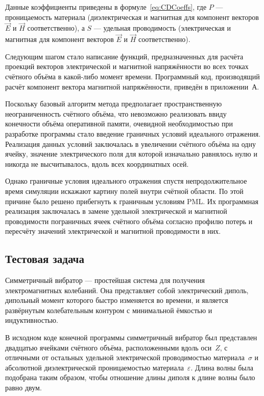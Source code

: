 Данные коэффициенты приведены в формуле~\eqref{eq:CDCoeffs}, где $ P $ --- проницаемость материала (диэлектрическая и магнитная для компонент векторов $\vec{E}$  и $\vec{H}$ соответственно), а $S$ --- удельная проводимость (электрическая и магнитная для компонент векторов $\vec{E}$  и $\vec{H}$ соответственно).

Следующим шагом стало написание функций, предназначенных для расчёта проекций векторов электрической и магнитной напряжённости во всех точках счётного объёма в какой-либо момент времени. Программный код, производящий расчёт компонент вектора магнитной напряжённости, приведён в приложении~А.

Поскольку базовый алгоритм метода предполагает пространственную неограниченность счётного объёма, что невозможно реализовать ввиду конечности объёма оперативной памяти, очевидной необходимостью при разработке программы стало введение граничных условий идеального отражения. Реализация данных условий заключалась в увеличении счётного объёма на одну ячейку, значение электрического поля для которой изначально равнялось нулю и никогда не высчитывалось, вдоль всех координатных осей.

Однако граничные условия идеального отражения спустя непродолжительное время симуляции искажают картину полей внутри счётной области. По этой причине было решено прибегнуть к граничным условиям PML. Их программная реализация заключалась в замене удельной электрической и магнитной проводимости пограничных ячеек счётного объёма согласно профилю потерь и пересчёту значений электрической и магнитной проводимости в них.

\subsection{Тестовая задача}

Симметричный вибратор --- простейшая система для получения электромагнитных колебаний. Она представляет собой электрический диполь, дипольный момент которого быстро изменяется во времени, и является развёрнутым колебательным контуром с минимальной ёмкостью и индуктивностью.

В исходном коде конечной программы симметричный вибратор был представлен двадцатью ячейками счётного объёма, расположенными вдоль оси~$ Z $, с отличными от остальных удельной электрической проводимостью материала~$\sigma$
и абсолютной диэлектрической проницаемостью материала~$\varepsilon$. Длина волны была подобрана таким образом, чтобы отношение длины диполя к длине волны было равно двум.

